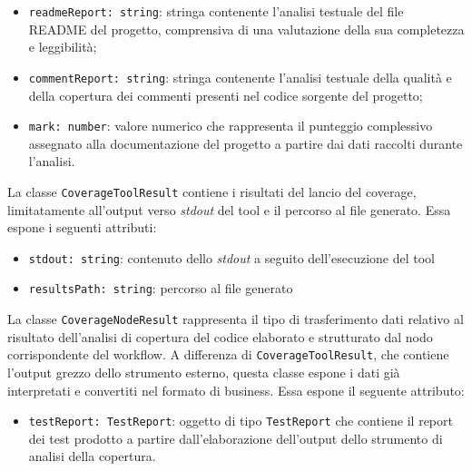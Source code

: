 \documentclass[a4paper, 11pt]{article}
\newcounter{subsubsubsection}[subsubsection]
\begin{document}
\begin{itemize}
  \item \texttt{readmeReport: string}: stringa contenente l'analisi testuale del file README del
    progetto, comprensiva di una valutazione della sua completezza e leggibilità;
 
  \item \texttt{commentReport: string}: stringa contenente l'analisi testuale della qualità e della
    copertura dei commenti presenti nel codice sorgente del progetto;
 
  \item \texttt{mark: number}: valore numerico che rappresenta il punteggio complessivo assegnato
    alla documentazione del progetto a partire dai dati raccolti durante l'analisi.
\end{itemize}

\label{sec:CoverageToolResult}
La classe \texttt{CoverageToolResult} contiene i risultati del lancio del coverage, limitatamente
all'output verso \textit{stdout} del tool e il percorso al file generato.
Essa espone i seguenti attributi:
\begin{itemize}
  \item \texttt{stdout: string}: contenuto dello \textit{stdout} a seguito dell'esecuzione del tool
  \item \texttt{resultsPath: string}: percorso al file generato
\end{itemize}

\label{sec:CoverageNodeResult}
 
La classe \texttt{CoverageNodeResult} rappresenta il tipo di trasferimento dati relativo al
risultato dell'analisi di copertura del codice elaborato e strutturato dal nodo corrispondente del
workflow. A differenza di \texttt{CoverageToolResult}, che contiene l'output grezzo dello strumento
esterno, questa classe espone i dati già interpretati e convertiti nel formato di business. Essa
espone il seguente attributo:
 
\begin{itemize}
  \item \texttt{testReport: TestReport}: oggetto di tipo \texttt{TestReport} che contiene il
    report dei test prodotto a partire dall'elaborazione dell'output dello strumento di analisi
    della copertura.
\end{itemize}


\label{sec:CoverageReport}
 
\end{document}
